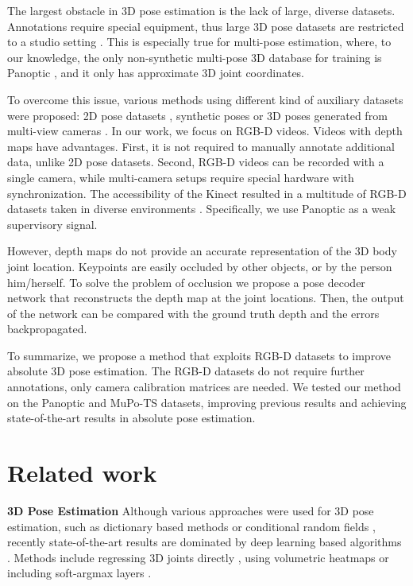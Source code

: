 \documentclass[runningheads]{llncs}
\begin{document}
The largest obstacle in 3D pose estimation is the lack of large, diverse datasets. Annotations require special equipment, thus large 3D pose datasets are restricted to a studio setting \cite{humaneva,h36m}. This is especially true for multi-pose estimation, where, to our knowledge, the only non-synthetic multi-pose 3D database for training is Panoptic \cite{panoptic}, and it only has approximate 3D joint coordinates.

To overcome this issue, various methods using different kind of auxiliary datasets were proposed: 2D pose datasets \cite{zhou2017}, synthetic poses \cite{llcs} or 3D poses generated from multi-view cameras  \cite{kocabas2019epipolar}.
In our work, we focus on RGB\nobreakdash-D videos. Videos with depth maps have advantages. First, it is not required to manually annotate additional data, unlike 2D pose datasets. Second, RGB-D videos can be recorded with a single camera, while multi-camera setups require special hardware with synchronization. The accessibility of the Kinect resulted in a multitude of RGB-D datasets taken in diverse environments \cite{firman2016rgbddatasets}. Specifically, we use Panoptic \cite{panoptic} as a weak supervisory signal.

However, depth maps do not provide an accurate representation of the 3D body joint location. Keypoints are easily occluded by other objects, or by the person him/herself. To solve the problem of occlusion we propose a pose decoder network that reconstructs the depth map at the joint locations.
Then, the output of the network can be compared with the ground truth depth and the errors backpropagated.

To summarize, we propose a method that exploits RGB\nobreakdash-D datasets to improve absolute 3D pose estimation. The RGB\nobreakdash-D datasets do not require further annotations, only camera calibration matrices are needed. We tested our method on the Panoptic and MuPo-TS datasets, improving previous results and achieving state-of-the-art results in absolute pose estimation.


\section{Related work}

\textbf{3D Pose Estimation} Although various approaches were used for 3D pose estimation, such as dictionary based methods \cite{ramakrishna2012dictionary,zhou2015dict} or conditional random fields \cite{belagiannis2014pictorialpose}, recently state-of-the-art results are dominated by deep learning based algorithms  \cite{lichan2015humanpose,3dbaseline,gorog,rogez2017lcrnet,llcs,integralPose}. Methods include regressing 3D joints directly \cite{lichan2015humanpose}, using volumetric heatmaps  \cite{gorog} or including soft-argmax layers \cite{integralPose}.
\end{document}
